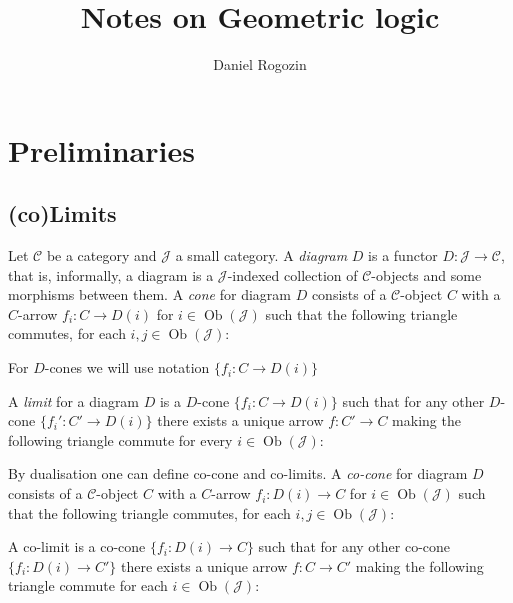 \documentclass[a4paper]{article}
\author{Daniel Rogozin}
\date{}
\title{Notes on Geometric logic}
\theoremstyle{defin}
\theoremstyle{theorem}
\theoremstyle{claim}
\theoremstyle{prop}
\theoremstyle{lemma}
\theoremstyle{fact}
\theoremstyle{ex}
\theoremstyle{col}
\begin{document}
\maketitle

\tableofcontents

\newpage

\nocite{*}

\section{Preliminaries}

\subsection{(co)Limits}

Let $\mathcal{C}$ be a category and $\mathcal{J}$ a small category. A \emph{diagram} $D$ is a functor $D : \mathcal{J} \to \mathcal{C}$, that is, informally, a diagram is a $\mathcal{J}$-indexed collection of $\mathcal{C}$-objects and some morphisms between them. A \emph{cone} for diagram $D$ consists of a $\mathcal{C}$-object $C$ with a $C$-arrow $f_i : C \to D(i)$ for $i \in \operatorname{Ob}(\mathcal{J})$ such that the following triangle commutes, for each $i, j \in \operatorname{Ob}(\mathcal{J})$:

\centerline{
}
For $D$-cones we will use notation $\{f_i : C \to D(i) \}$

A \emph{limit} for a diagram $D$ is a $D$-cone $\{f_i : C \to D(i) \}$ such that for any other $D$-cone $\{f_i' : C' \to D(i) \}$ there exists a unique arrow $f : C' \to C$ making the following triangle commute for every $i \in \operatorname{Ob}(\mathcal{J})$:

\centerline{
}

By dualisation one can define co-cone and co-limits. A \emph{co-cone} for diagram $D$ consists of a $\mathcal{C}$-object $C$ with a $C$-arrow $f_i : D(i) \to C$ for $i \in \operatorname{Ob}(\mathcal{J})$ such that the following triangle commutes, for each $i, j \in \operatorname{Ob}(\mathcal{J})$:

\centerline{
}

A co-limit is a co-cone $\{ f_i : D(i) \to C \}$ such that for any other co-cone $\{ f_i : D(i) \to C' \}$ there exists a unique arrow $f : C \to C'$ making the following triangle commute for each $i \in \operatorname{Ob}(\mathcal{J})$:
\centerline{
}
\end{document}

